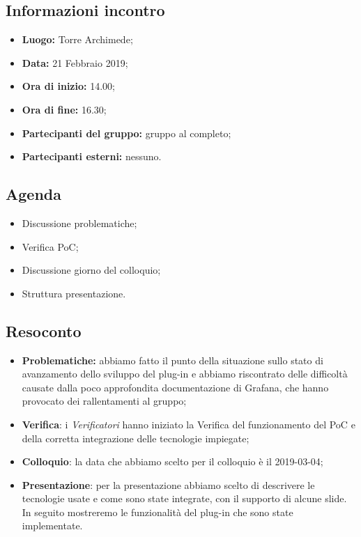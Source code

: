 \subsection{Informazioni incontro}
\begin{itemize}
	\item { \textbf{Luogo:} Torre Archimede};
	\item { \textbf{Data:} 21 Febbraio 2019};
	\item { \textbf{Ora di inizio:} 14.00};
	\item { \textbf{Ora di fine:} 16.30};
	\item { \textbf{Partecipanti del gruppo:} gruppo al completo};
	\item { \textbf{Partecipanti esterni:} nessuno}.
\end{itemize}


\subsection{Agenda}
\begin{itemize}
	\item {Discussione problematiche;}
	\item {Verifica PoC;}
	\item {Discussione giorno del colloquio;}
	\item {Struttura presentazione.}
\end{itemize}

\subsection{Resoconto}
\begin{itemize}
	\item {\textbf{Problematiche:} abbiamo fatto il punto della situazione sullo stato di avanzamento dello sviluppo del plug-in e abbiamo riscontrato delle difficoltà causate dalla poco approfondita documentazione di Grafana, che hanno provocato dei rallentamenti al gruppo;}
	\item { \textbf{Verifica}: i \emph{Verificatori} hanno iniziato la Verifica del funzionamento del PoC e della corretta integrazione delle tecnologie impiegate;}
	\item { \textbf{Colloquio}: la data che abbiamo scelto per il colloquio è il 2019-03-04;}
	\item { \textbf{Presentazione}: per la presentazione abbiamo scelto di descrivere le tecnologie usate e come sono state integrate, con il supporto di alcune slide. In seguito mostreremo le funzionalità del plug-in che sono state implementate.}
\end{itemize}

